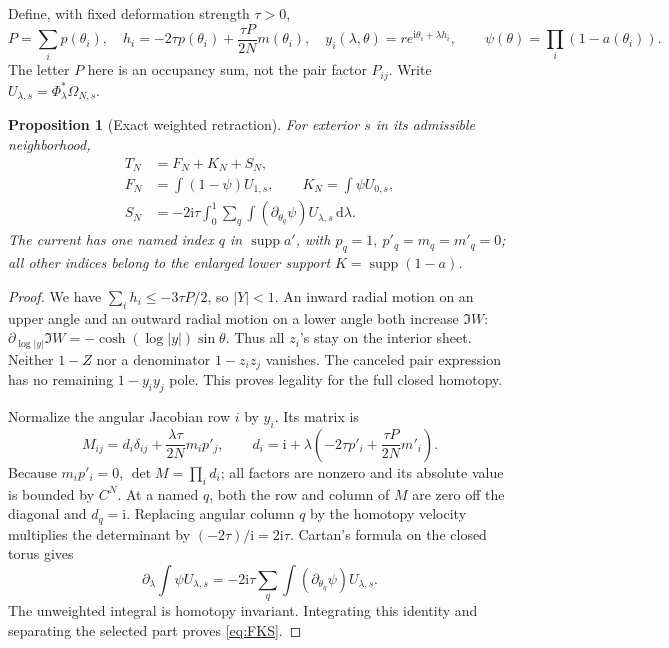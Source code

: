 \documentclass[11pt]{article}
\numberwithin{equation}{section}
\newtheorem{proposition}[theorem]{Proposition}
\theoremstyle{definition}
\newcommand{\dd}{\,\mathrm d}
\newcommand{\ii}{\mathrm i}
\begin{document}
Define, with fixed deformation strength \(\tau>0\),
\[
 P=\sum_i p(\theta_i),\quad
 h_i=-2\tau p(\theta_i)+\frac{\tau P}{2N}m(\theta_i),\quad
 y_i(\lambda,\theta)=r e^{\ii\theta_i+\lambda h_i},
 \qquad \psi(\theta)=\prod_i(1-a(\theta_i)).
\]
The letter \(P\) here is an occupancy sum, not the pair factor \(P_{ij}\).
Write \(U_{\lambda,s}=\Phi_\lambda^*\Omega_{N,s}\).

\begin{proposition}[Exact weighted retraction]\label{prop:selector}
For exterior \(s\) in its admissible neighborhood,
\begin{align}
 T_N&=F_N+K_N+S_N,\label{eq:FKS}\\
 F_N&=\int(1-\psi)U_{1,s},\qquad K_N=\int\psi U_{0,s},\nonumber\\
 S_N&=-2\ii\tau\int_0^1\sum_q\int
                         (\partial_{\theta_q}\psi)U_{\lambda,s}\dd\lambda.
 \label{eq:current}
\end{align}
The current has one named index \(q\) in \(\operatorname{supp}a'\),
with \(p_q=1,\ p'_q=m_q=m'_q=0\); all other indices belong to
the enlarged lower support \(K=\operatorname{supp}(1-a)\).
\end{proposition}
\begin{proof}
We have \(\sum_i h_i\le-3\tau P/2\), so \(|Y|<1\).
An inward radial motion on an upper angle and an outward radial motion
on a lower angle both increase \(\Im W\):
\(\partial_{\log|y|}\Im W=-\cosh(\log|y|)\sin\theta\).
Thus all \(z_i\)'s stay on the interior sheet. Neither \(1-Z\)
nor a denominator \(1-z_iz_j\) vanishes. The canceled pair expression
has no remaining \(1-y_iy_j\) pole. This proves legality for the full
closed homotopy.

Normalize the angular Jacobian row \(i\) by \(y_i\). Its matrix is
\[
 M_{ij}=d_i\delta_{ij}+\frac{\lambda\tau}{2N}m_i p'_j,\qquad
 d_i=\ii+\lambda\left(-2\tau p'_i+\frac{\tau P}{2N}m'_i\right).
\]
Because \(m_ip'_i=0\), \(\det M=\prod_i d_i\); all factors are
nonzero and its absolute value is bounded by \(C^N\).
At a named \(q\), both the row and column of \(M\) are zero
off the diagonal and \(d_q=\ii\). Replacing angular column \(q\)
by the homotopy velocity multiplies the determinant by
\((-2\tau)/\ii=2\ii\tau\).
Cartan's formula on the closed torus gives
\[
 \partial_\lambda\int\psi U_{\lambda,s}
 =-2\ii\tau\sum_q\int(\partial_{\theta_q}\psi)U_{\lambda,s}.
\]
The unweighted integral is homotopy invariant. Integrating this identity
and separating the selected part proves \eqref{eq:FKS}.
\end{proof}
\end{document}
